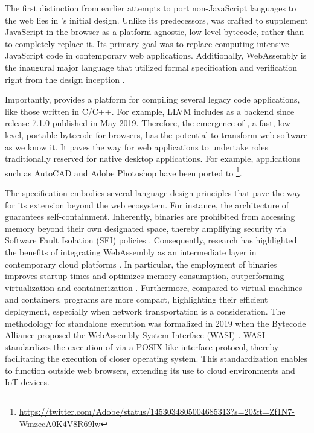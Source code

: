 The first distinction from earlier attempts to port non-JavaScript languages to the web lies in \Wasm's initial design. 
Unlike its predecessors, \Wasm was crafted to supplement JavaScript in the browser as a platform-agnostic, low-level bytecode, rather than to completely replace it. 
Its primary goal was to replace computing-intensive JavaScript code in contemporary web applications. 
Additionally, WebAssembly is the inaugural major language that utilized formal specification and verification right from the design inception \cite{Haas_2017, watt2018mechanising}. 


Importantly, \Wasm provides a platform for compiling several legacy code applications, like those written in C/C++. 
For example, LLVM includes \Wasm  as a backend since release 7.1.0 published in May 2019.
Therefore, the emergence of \Wasm, a fast, low-level, portable bytecode for browsers, has the potential to transform web software as we know it. 
It paves the way for web applications to undertake roles traditionally reserved for native desktop applications.
For example, applications such as AutoCAD and Adobe Photoshop have been ported to \Wasm \footnote{\url{https://twitter.com/Adobe/status/1453034805004685313?s=20&t=Zf1N7-WmzecA0K4V8R69lw}}. 


The \Wasm specification embodies several language design principles that pave the way for its extension beyond the web ecosystem.
For instance, the architecture of \Wasm guarantees self-containment.
Inherently, \Wasm binaries are prohibited from accessing memory beyond their own designated space, thereby amplifying security via Software Fault Isolation (SFI)  policies \cite{gobi}.
Consequently, research has highlighted the benefits of integrating WebAssembly as an intermediate layer in contemporary cloud platforms \cite{pMendkiServerless}.
In particular, the employment of \Wasm binaries improves startup times and optimizes memory consumption, outperforming virtualization and containerization \cite{1244493Jacobsson}.
Furthermore, compared to virtual machines and containers, \Wasm programs are more compact, highlighting their efficient deployment, especially when network transportation is a consideration.
The methodology for standalone \Wasm execution was formalized in 2019 when the Bytecode Alliance proposed the WebAssembly System Interface (WASI) .
WASI standardizes the execution of \Wasm via a POSIX-like interface protocol, thereby facilitating the execution of \Wasm closer operating system.
This standardization enables \Wasm to function outside web browsers, extending its use to cloud environments and IoT devices.

